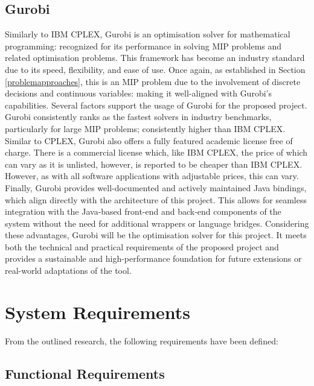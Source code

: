 \subsection{Gurobi}
Similarly to IBM CPLEX, Gurobi \citep{gurobi} is an optimisation solver for mathematical programming: recognized for its performance in solving MIP problems and related optimisation problems. This framework has become an industry standard due to its speed, flexibility, and ease of use. Once again, as established in Section \ref{problemapproaches}, this is an MIP problem due to the involvement of discrete decisions and continuous variables: making it well-aligned with Gurobi's capabilities.\newline
Several factors support the usage of Gurobi for the proposed project. Gurobi consistently ranks as the fastest solvers in industry benchmarks, particularly for large MIP problems; consistently higher than IBM CPLEX. Similar to CPLEX, Gurobi also offers a fully featured academic license free of charge. There is a commercial license which, like IBM CPLEX, the price of which can vary as it is unlisted, however, is reported to be cheaper than IBM CPLEX. However, as with all software applications with adjustable prices, this can vary. Finally, Gurobi provides well-documented and actively maintained Java bindings, which align directly with the architecture of this project. This allows for seamless integration with the Java-based front-end and back-end components of the system without the need for additional wrappers or language bridges.\newline
Considering these advantages, Gurobi will be the optimisation solver for this project. It meets both the technical and practical requirements of the proposed project and provides a sustainable and high-performance foundation for future extensions or real-world adaptations of the tool.


\section{System Requirements}\label{systemrequirements}
From the outlined research, the following requirements have been defined:

\subsection{Functional Requirements}

